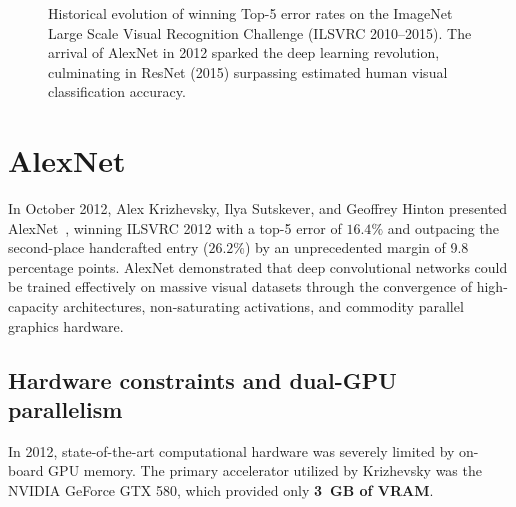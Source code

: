 \begin{figure}[H]
\caption{Historical evolution of winning Top-5 error rates on the ImageNet Large Scale Visual Recognition Challenge (ILSVRC 2010--2015). The arrival of AlexNet in 2012 sparked the deep learning revolution, culminating in ResNet (2015) surpassing estimated human visual classification accuracy.}
\label{fig:imagenet_historical_timeline}
\end{figure}

\section{AlexNet}
\label{sec:alexnet_model}

In October 2012, Alex Krizhevsky, Ilya Sutskever, and Geoffrey Hinton presented AlexNet~\cite{krizhevsky2012imagenet}, winning ILSVRC 2012 with a top-5 error of $16.4\%$ and outpacing the second-place handcrafted entry ($26.2\%$) by an unprecedented margin of 9.8 percentage points. AlexNet demonstrated that deep convolutional networks could be trained effectively on massive visual datasets through the convergence of high-capacity architectures, non-saturating activations, and commodity parallel graphics hardware.

\subsection{Hardware constraints and dual-GPU parallelism}
\label{sec:alexnet_dual_gpu}

In 2012, state-of-the-art computational hardware was severely limited by on-board GPU memory. The primary accelerator utilized by Krizhevsky was the NVIDIA GeForce GTX 580, which provided only \textbf{3~GB of VRAM}.


